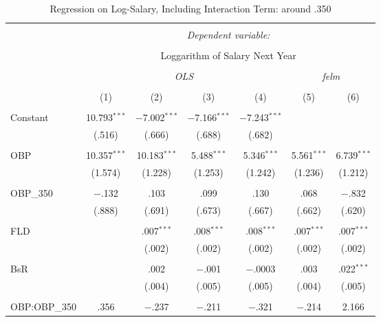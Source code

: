 
\begin{table}[H] \centering
  \caption{Regression on Log-Salary, Including Interaction Term: around .350}
  \label{OBP350_E}
\tiny
\begin{tabular}{@{\extracolsep{5pt}}lcccccc}
\\[-1.8ex]\hline
\hline \\[-1.8ex]
 & \multicolumn{6}{c}{\textit{Dependent variable:}} \\
\cline{2-7}
\\[-1.8ex] & \multicolumn{6}{c}{Loggarithm of Salary Next Year} \\
\\[-1.8ex] & \multicolumn{4}{c}{\textit{OLS}} & \multicolumn{2}{c}{\textit{felm}} \\
\\[-1.8ex] & (1) & (2) & (3) & (4) & (5) & (6)\\
\hline \\[-1.8ex]
 Constant & 10.793$^{***}$ & $-$7.002$^{***}$ & $-$7.166$^{***}$ & $-$7.243$^{***}$ &  &  \\
  & (.516) & (.666) & (.688) & (.682) &  &  \\
  & & & & & & \\
 OBP & 10.357$^{***}$ & 10.183$^{***}$ & 5.488$^{***}$ & 5.346$^{***}$ & 5.561$^{***}$ & 6.739$^{***}$ \\
  & (1.574) & (1.228) & (1.253) & (1.242) & (1.236) & (1.212) \\
  & & & & & & \\
 OBP\_350 & $-$.132 & .103 & .099 & .130 & .068 & $-$.832 \\
  & (.888) & (.691) & (.673) & (.667) & (.662) & (.620) \\
  & & & & & & \\
 FLD &  & .007$^{***}$ & .008$^{***}$ & .008$^{***}$ & .007$^{***}$ & .007$^{***}$ \\
  &  & (.002) & (.002) & (.002) & (.002) & (.002) \\
  & & & & & & \\
 BsR &  & .002 & $-$.001 & $-$.0003 & .003 & .022$^{***}$ \\
  &  & (.004) & (.005) & (.005) & (.004) & (.005) \\
  & & & & & & \\
 OBP:OBP\_350 & .356 & $-$.237 & $-$.211 & $-$.321 & $-$.214 & 2.166 \\

\end{tabular}
\end{table}
